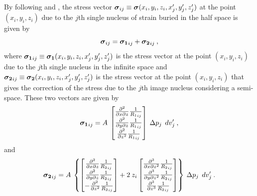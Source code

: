 \documentclass[journal abbreviation, manuscript]{copernicus}
\begin{document}
By following \cite{Sharma56} and \cite{Tempone10}, 
the stress vector 
$\mbox{\boldmath$\sigma$}_{ij} \equiv \mbox{\boldmath$\sigma$}(x_{i}, y_{i}, z_{i}, x^{\prime}_{j}, y^{\prime}_{j}, z^{\prime}_{j})$ 
at the point $(x_{i}, y_{i}, z_{i})$ due to the $j$th single nucleus of strain buried 
in the half space is given by
\begin{equation}
\mbox{\boldmath$\sigma$}_{ij} = \mbox{\boldmath$\sigma_{1}$}_{ij} + 
\mbox{\boldmath$\sigma_{2}$}_{ij} \: ,
\label{eq:stress_nucleus}
\end{equation}
where 
$\mbox{\boldmath$\sigma_{1}$}_{ij} \equiv \mbox{\boldmath$\sigma_{1}$}(x_{i}, y_{i}, z_{i}, x^{\prime}_{j}, y^{\prime}_{j}, z^{\prime}_{j})$ is the stress vector 
at the point $(x_{i}, y_{i}, z_{i})$ due to the $j$th single nucleus in the infinite space and $\mbox{\boldmath$\sigma_{2}$}_{ij} \equiv \mbox{\boldmath$\sigma_{2}$}(x_{i}, y_{i}, z_{i}, x^{\prime}_{j}, y^{\prime}_{j}, z^{\prime}_{j})$ is the stress vector 
at the point $(x_{i}, y_{i}, z_{i})$ that gives the correction of the stress due to the 
$j$th image nucleus considering a semi-space. These two vectors are given by
\begin{equation}
\mbox{\boldmath$\sigma_{1}$}_{ij} =
A  \: 
\begin{bmatrix} 
\frac{\partial^{2} }{\partial x \partial z} {\frac{1}{{R_1}_{ij}}}  \\
\frac{\partial^{2} }{\partial y \partial z} {\frac{1}{{R_1}_{ij}}}  \\
\frac{\partial^{2} }{\partial z^{2}} {\frac{1}{{R_1}_{ij}}} 
\end{bmatrix}
\: \Delta p_{j} \: \:dv_j^{\prime} \: ,
\label{eq:nucleus-stress1-vector}
\end{equation}
and 
\begin{equation}
\mbox{\boldmath$\sigma_{2}$}_{ij} = 
A  \: 
\left\{
\begin{bmatrix} 
\frac{\partial^{2}  }{\partial x \partial z} {\frac{1}{{R_2}_{ij}}} \\
\frac{\partial^{2} }{\partial y \partial z} {\frac{1}{{R_2}_{ij}}} \\
- \frac{\partial^{2} }{\partial z^{2}} {\frac{1}{{R_2}_{ij}}}   
\end{bmatrix}
+ 2 \: z_{i}
\begin{bmatrix} 
\frac{\partial^{3}  }{\partial x \partial z^{2}} {\frac{1}{{R_2}_{ij}}} \\
\frac{\partial^{3} }{\partial y \partial z^{2}} {\frac{1}{{R_2}_{ij}}} \\
\frac{\partial^{3} }{\partial z^{3}} {\frac{1}{{R_2}_{ij}}} 
\end{bmatrix}
\right\}
\: \Delta p_{j} \: \:dv_j^{\prime} \: .
\label{eq:nucleus-stress2-vector}
\end{equation}
\end{document}
